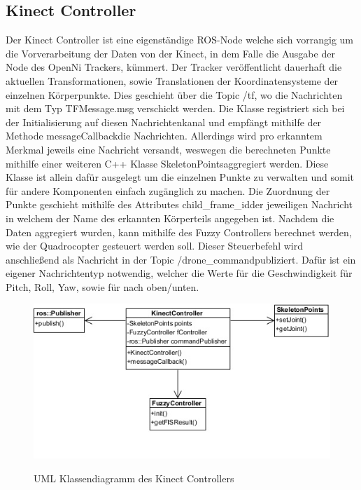 \subsection{Kinect Controller}
Der Kinect Controller ist eine eigenständige ROS-Node welche sich vorrangig um die Vorverarbeitung der Daten von der Kinect, in dem Falle die Ausgabe der Node des OpenNi Trackers, kümmert. Der Tracker veröffentlicht dauerhaft die aktuellen Transformationen, sowie Translationen der Koordinatensysteme der einzelnen Körperpunkte. Dies geschieht über die Topic \grqq /tf\grqq , wo die Nachrichten mit dem Typ \grqq TFMessage.msg\grqq \cite{tfmessage} \space verschickt werden. Die Klasse registriert sich bei der Initialisierung auf diesen Nachrichtenkanal und empfängt mithilfe der Methode \grqq messageCallback\grqq \space die Nachrichten. Allerdings wird pro erkanntem Merkmal jeweils eine Nachricht versandt, weswegen die berechneten Punkte mithilfe einer weiteren C++ Klasse \grqq SkeletonPoints\grqq \space aggregiert werden. Diese Klasse ist allein dafür ausgelegt um die einzelnen Punkte zu verwalten und somit für andere Komponenten einfach zugänglich zu machen. Die Zuordnung der Punkte geschieht mithilfe des Attributes \grqq child\_frame\_id\grqq der jeweiligen Nachricht in welchem der Name des erkannten Körperteils angegeben ist. Nachdem die Daten aggregiert wurden, kann mithilfe des Fuzzy Controllers berechnet werden, wie der Quadrocopter gesteuert werden soll. Dieser Steuerbefehl wird anschließend als Nachricht in der Topic \grqq /drone\_command\grqq \space publiziert. Dafür ist ein eigener Nachrichtentyp notwendig, welcher die Werte für die Geschwindigkeit für Pitch, Roll, Yaw, sowie für nach oben/unten.
\begin{figure}[ht]
	\centering
	\includegraphics[scale=0.7]{Bilder/KinectController.jpg}
	\label{UML Klassendiagramm des Kinect Controllers}
	\caption{UML Klassendiagramm des Kinect Controllers}
\end{figure}
